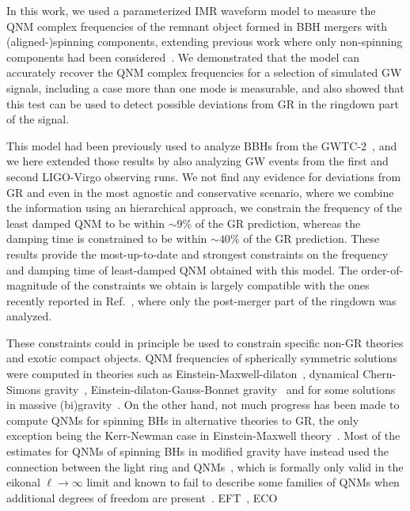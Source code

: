 In this work, we used a parameterized IMR waveform model to measure the QNM complex frequencies of the remnant object formed in BBH mergers with (aligned-)spinning components, extending previous work where only non-spinning components had been considered~\cite{Brito:2018rfr}. We demonstrated that the model can accurately recover the QNM complex frequencies for a selection of simulated GW signals, including a case more than one mode is measurable, and also showed that this test can be used to detect possible deviations from GR in the ringdown part of the signal.

This model had been previously used to analyze BBHs from the GWTC-2~\cite{Abbott:2020jks}, and we here extended those results by also analyzing GW events from the first and second LIGO-Virgo observing runs. We not find any evidence for deviations from GR and even in the most agnostic and conservative scenario, where we combine the information using an hierarchical approach, we constrain the frequency of the least damped QNM to be within $\sim 9\%$ of the GR prediction, whereas the damping time is constrained to be within $\sim 40\%$ of the GR prediction. These results provide the most-up-to-date and strongest constraints on the frequency and damping time of least-damped QNM obtained with this model. The order-of-magnitude of the constraints we obtain is largely compatible with the ones recently reported in Ref.~\cite{Carullo:2021dui}, where only the post-merger part of the ringdown was analyzed.

These constraints could in principle be used to constrain specific non-GR theories and exotic compact objects.
QNM frequencies of spherically symmetric solutions were computed in theories such as Einstein-Maxwell-dilaton~\cite{Ferrari:2000ep}, dynamical Chern-Simons gravity~\cite{Molina:2010fb}, Einstein-dilaton-Gauss-Bonnet gravity~\cite{Pani:2009wy,Blazquez-Salcedo:2016enn,Blazquez-Salcedo:2017txk} and for some solutions in massive (bi)gravity~\cite{Brito:2013wya,Brito:2013yxa,Babichev:2015zub}. On
the other hand, not much progress has been made to compute QNMs for
spinning BHs in alternative theories to GR, the only exception
being the Kerr-Newman case in Einstein-Maxwell
theory~\cite{Pani:2013ija,Pani:2013wsa,Mark:2014aja,Dias:2015wqa}. Most
of the estimates for QNMs of spinning BHs in modified gravity have
instead used the connection between the light ring and
QNMs~\cite{Blazquez-Salcedo:2016enn,Glampedakis:2017dvb,Jai-akson:2017ldo,Glampedakis:2017cgd},
which is formally only valid in the eikonal $\ell \to \infty$ limit
and known to fail to describe some families of QNMs when additional
degrees of freedom are present~\cite{Blazquez-Salcedo:2016enn}.  
EFT~\cite{Franciolini:2018uyq,Cano:2020cao,Cardoso:2018ptl}, ECO~\cite{Maggio:2020jml}

